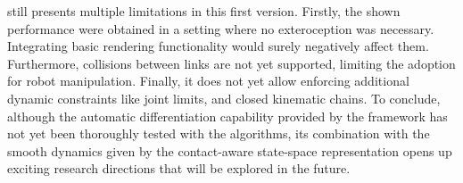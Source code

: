 \jaxsim still presents multiple limitations in this first version.
Firstly, the shown performance were obtained in a setting where no exteroception was necessary.
Integrating basic rendering functionality would surely negatively affect them.
Furthermore, collisions between links are not yet supported, limiting the adoption for robot manipulation.
Finally, it does not yet allow enforcing additional dynamic constraints like joint limits, and closed kinematic chains.
To conclude, although the automatic differentiation capability provided by the \jax framework has not yet been thoroughly tested with the \jaxsim algorithms, its combination with the smooth dynamics given by the contact-aware state-space representation opens up exciting research directions that will be explored in the future.
